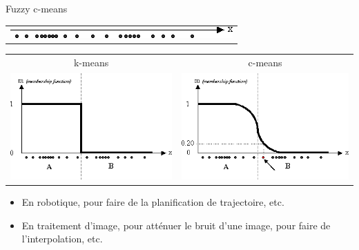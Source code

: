 \documentclass[aspectratio=169,professionalfonts, 12pt]{beamer}
\begin{document}
\begin{frame}{Fuzzy c-means}
  \centering
    \begin{tabular}{c}
    \includegraphics[scale=0.5]{images/image1.png}
  \end{tabular}

  \vspace{1em}
    \begin{tabular}{cc}
      k-means & c-means \\
      \includegraphics[scale=0.5]{images/image2.png}
      &
      \includegraphics[scale=0.5]{images/image3.png}
    \end{tabular}
\end{frame}

\begin{frame}
  \begin{itemize}
    \item En robotique, pour faire de la planification de trajectoire, etc.
    \item En traitement d'image, pour atténuer le bruit d'une image, pour faire de l’interpolation, etc.
  \end{itemize}
\end{frame}
\end{document}
